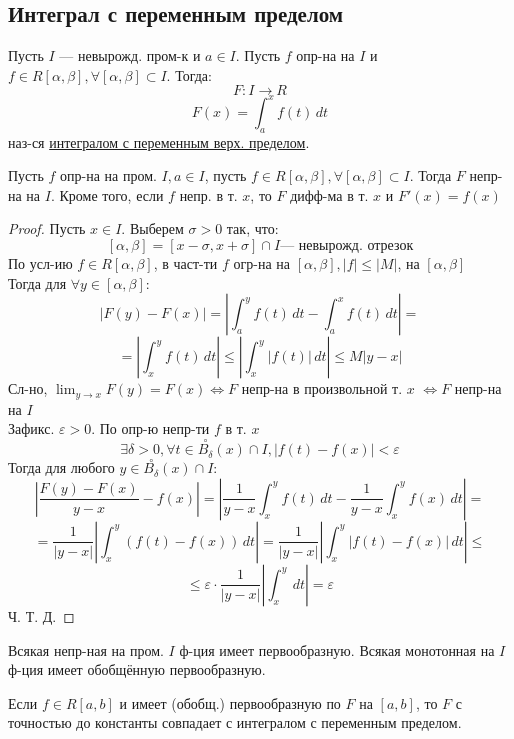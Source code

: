 \subsection{Интеграл с переменным пределом}
\begin{definition}
Пусть $I$ --- невырожд. пром-к и $a \in I$. Пусть $f$ опр-на на $I$ и $f \in R[\alpha, \beta], \forall [\alpha, \beta] \subset I$. Тогда:
\[
F\colon I \rightarrow R
\]
\[
F(x) = \int_{a}^{x} f(t) \, dt
\]
наз-ся \underline{интегралом с переменным верх. пределом}.
\end{definition}
\begin{theorem}
\label{th:27-Basic-Integral-Theorem(8)}
Пусть $f$ опр-на на пром. $I, a \in I$, пусть $f \in R[\alpha, \beta], \forall [\alpha, \beta] \subset I$. Тогда $F$ непр-на на $I$. Кроме того, если $f$ непр. в т. $x$, то $F$ дифф-ма в т. $x$ и $F'(x) = f(x)$
\end{theorem}
\begin{proof}
Пусть $x \in I$. Выберем $\sigma > 0$ так, что:
\[
[\alpha, \beta] = [x - \sigma, x + \sigma] \cap I \text{---  невырожд. отрезок}
\]
По усл-ию $f \in R[\alpha, \beta]$, в част-ти $f$ огр-на на $[\alpha, \beta], \left|f\right| \leq \left|M\right|$, на $[\alpha, \beta]$ \\
Тогда для $\forall y \in [\alpha, \beta]$:
\[
\left|F(y) - F(x)\right| = \left|\int_{a}^{y} f(t) \, dt - \int_{a}^{x} f(t) \, dt\right| = 
\]
\[
 = \left|\int_{x}^{y} f(t) \, dt\right| \leq \left|\int_{x}^{y} \left|f(t)\right| \, dt\right| \leq M|y - x|
\]
Сл-но, $\lim_{y\to x} F(y) = F(x) \iff F$ непр-на в произвольной т. $x$ $\iff F$ непр-на на $I$ \\
Зафикс. $\varepsilon > 0$. По опр-ю непр-ти $f$ в т. $x$
\[
  \exists \delta > 0, \forall t \in \overset{\circ}{B_{\delta}}(x) \cap I, \left|f(t) - f(x)\right| < \varepsilon
\]
Тогда для любого $y \in \overset{\circ}{B_{\delta}}(x) \cap I$:
\[
\left|\frac{F(y) - F(x)}{y - x} - f(x)\right| = \left|\frac{1}{y - x}\int_{x}^{y}  f(t) \, dt - \frac{1}{y - x} \int_{x}^{y} f(x) \, dt\right| = 
\]
\[
=  \frac{1}{\left|y -x \right|}\left|\int_{x}^{y} (f(t) - f(x)) \, dt\right| = \frac{1}{\left|y - x\right|} \left|\int_{x}^{y} \left|f(t) - f(x)\right| \, dt\right| \leq
\]
\[
 \leq  \varepsilon \cdot \frac{1}{\left|y -x \right|} \left| \int_{x}^{y}\, dt\right| = \varepsilon
\]
Ч. Т. Д.
\end{proof}
\begin{consequence}
Всякая непр-ная на пром. $I$ ф-ция имеет первообразную. Всякая монотонная на $I$ ф-ция имеет обобщённую первообразную.
\end{consequence}
\begin{note}
Если $f \in R[a, b]$ и имеет (обобщ.) первообразную по $F$ на $[a, b]$, то $F$ с точностью до константы совпадает с интегралом с переменным пределом.
\end{note}
